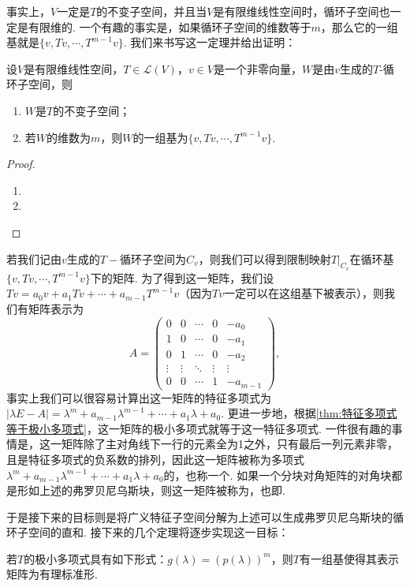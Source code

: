事实上，$V$一定是$T$的不变子空间，并且当$V$是有限维线性空间时，循环子空间也一定是有限维的. 一个有趣的事实是，如果循环子空间的维数等于$m$，那么它的一组基就是$\{v,Tv,\cdots,T^{m-1}v\}$. 我们来书写这一定理并给出证明：
\begin{theorem}{}{}
    设$V$是有限维线性空间，$T\in\mathcal{L}(V)$，$v\in V$是一个非零向量，$W$是由$v$生成的$T$-循环子空间，则
    \begin{enumerate}
        \item $W$是$T$的不变子空间；
        \item 若$W$的维数为$m$，则$W$的一组基为$\{v,Tv,\cdots,T^{m-1}v\}$.
    \end{enumerate}
\end{theorem}
\begin{proof}
    \begin{enumerate}
        \item
        \item
    \end{enumerate}
\end{proof}

若我们记由$v$生成的$T-\text{循环子空间}$为$C_v$，则我们可以得到限制映射$T|_{C_v}$在循环基$\{v,Tv,\cdots,T^{m-1}v\}$下的矩阵. 为了得到这一矩阵，我们设$Tv=a_0v+a_1Tv+\cdots+a_{m-1}T^{m-1}v$（因为$Tv$一定可以在这组基下被表示），则我们有矩阵表示为
\[A=\begin{pmatrix}
        0      & 0      & \cdots & 0      & -a_0     \\
        1      & 0      & \cdots & 0      & -a_1     \\
        0      & 1      & \cdots & 0      & -a_2     \\
        \vdots & \vdots & \ddots & \vdots & \vdots   \\
        0      & 0      & \cdots & 1      & -a_{m-1}
    \end{pmatrix},\]
事实上我们可以很容易计算出这一矩阵的特征多项式为$|\lambda E-A|=\lambda^m+a_{m-1}\lambda^{m-1}+\cdots+a_1\lambda+a_0$. 更进一步地，根据\autoref{thm:特征多项式等于极小多项式}，这一矩阵的极小多项式就等于这一特征多项式. 一件很有趣的事情是，这一矩阵除了主对角线下一行的元素全为1之外，只有最后一列元素非零，且是特征多项式的负系数的排列，因此这一矩阵被称为多项式$\lambda^m+a_{m-1}\lambda^{m-1}+\cdots+a_1\lambda+a_0$的，也称一个. 如果一个分块对角矩阵的对角块都是形如上述的弗罗贝尼乌斯块，则这一矩阵被称为，也即.

于是接下来的目标则是将广义特征子空间分解为上述可以生成弗罗贝尼乌斯块的循环子空间的直和. 接下来的几个定理将逐步实现这一目标：
\begin{theorem}{}{}
    若$T$的极小多项式具有如下形式：$g(\lambda)=(p(\lambda))^m$，则$T$有一组基使得其表示矩阵为有理标准形.
\end{theorem}

